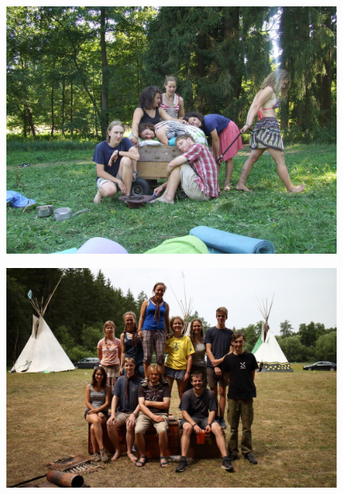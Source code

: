 \begin{center}

\includegraphics[width=11cm]{img/udove_hanyetu.JPG}
\vspace*{10pt}

\includegraphics[width=11cm]{img/udove_anpetu.JPG}


\end{center}
